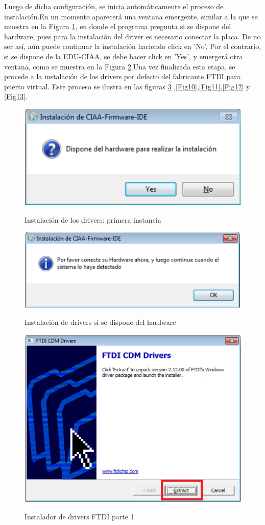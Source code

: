 \documentclass[12pt,letterpaper]{article}
\begin{document}
Luego de dicha configuración, se inicia automáticamente el proceso de instalación.En un momento aparecerá una ventana emergente, similar a la que se muestra en la Figura \ref{Fig8}, en donde el programa pregunta si se dispone del hardware, pues para la instalación del driver es necesario conectar la placa. De no  ser así, aún puede continuar la instalación haciendo click en 'No'. Por el contrario, si se dispone de la EDU-CIAA, se debe hacer click en 'Yes', y emergerá otra ventana, como se muestra en la Figura \ref{Fig9}.Una vez finalizada esta etapa, se procede a la instalación de los drivers por defecto del fabricante FTDI para puerto virtual. Este proceso se ilustra en las figuras \ref{driversFTDI} ,\ref{Fig10},\ref{Fig11},\ref{Fig12} y \ref{Fig13}.
\begin{figure}[!h]
\centering
\includegraphics[width=6 cm]{figuras/instalacion5.png}\\
\caption{Instalación de los drivers: primera instancia}
\label{Fig8}
\end{figure}
\begin{figure}[!h]
\centering
\includegraphics[width=6 cm]{figuras/instalacion6.png}\\
\caption{Instalación de drivers si se dispone del hardware}
\label{Fig9}
\end{figure}
\begin{figure}[!h]
\centering
\includegraphics[width=6 cm]{figuras/instalacion7.png}\\
\caption{Instalador de drivers FTDI parte 1}
\label{driversFTDI}
\end{figure}
\end{document}
